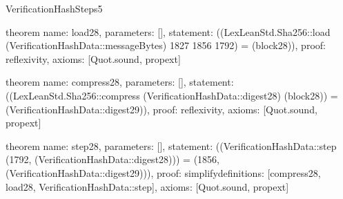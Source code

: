 \begin{lexlean}{VerificationHashSteps5}
\begin{semanticmodule}
theorem{
  name: load28,
  parameters: [],
  statement: ((LexLeanStd.Sha256::load (VerificationHashData::messageBytes) 1827 1856 1792) = (block28)),
  proof: reflexivity{},
  axioms: [Quot.sound, propext]
}

theorem{
  name: compress28,
  parameters: [],
  statement: ((LexLeanStd.Sha256::compress (VerificationHashData::digest28) (block28)) = (VerificationHashData::digest29)),
  proof: reflexivity{},
  axioms: [Quot.sound, propext]
}

theorem{
  name: step28,
  parameters: [],
  statement: ((VerificationHashData::step (1792, (VerificationHashData::digest28))) = (1856, (VerificationHashData::digest29))),
  proof: simplify{definitions: [compress28, load28, VerificationHashData::step]},
  axioms: [Quot.sound, propext]
}

\end{semanticmodule}
\end{lexlean}
